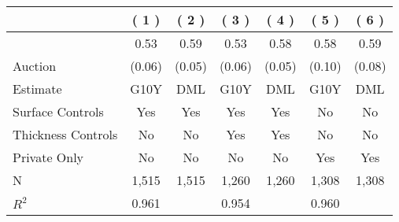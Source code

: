
\begin{tabular}{lcccccc}
\toprule
 & ( 1 ) & ( 2 ) & ( 3 ) & ( 4 ) & ( 5 ) & ( 6 )\\
\midrule
 & 0.53 & 0.59 & 0.53 & 0.58 & 0.58 & 0.59\\

\multirow{-2}{*}{\raggedright\arraybackslash Auction} & (0.06) & (0.05) & (0.06) & (0.05) & (0.10) & (0.08)\\

\midrule
Estimate & G10Y & DML & G10Y & DML & G10Y & DML\\

Surface Controls & Yes & Yes & Yes & Yes & No & No\\

Thickness Controls & No & No & Yes & Yes & No & No\\

Private Only & No & No & No & No & Yes & Yes\\

N & 1,515 & 1,515 & 1,260 & 1,260 & 1,308 & 1,308\\

$R^2$ & 0.961 &  & 0.954 &  & 0.960 & \\
\bottomrule
\end{tabular}
